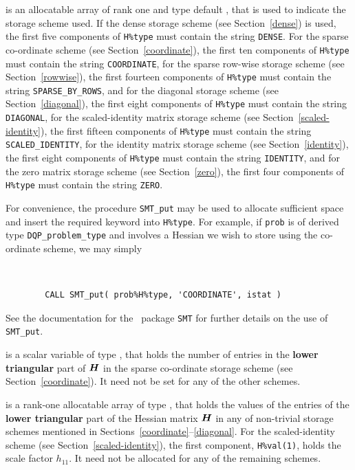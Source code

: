 \documentclass{galahad}
\newcommand{\packagename}{DQP}
\begin{document}
\begin{description}
\begin{description}
 is an allocatable array of rank one and type default \character,
that is used to indicate the storage scheme used. If the dense storage scheme
(see Section~\ref{dense}) is used,
the first five components of {\tt H\%type} must contain the
string {\tt DENSE}.
For the sparse co-ordinate scheme (see Section~\ref{coordinate}),
the first ten components of {\tt H\%type} must contain the
string {\tt COORDINATE},
for the sparse row-wise storage scheme (see Section~\ref{rowwise}),
the first fourteen components of {\tt H\%type} must contain the
string {\tt SPARSE\_BY\_ROWS},
and for the diagonal storage scheme (see Section~\ref{diagonal}),
the first eight components of {\tt H\%type} must contain the
string {\tt DIAGONAL},
for the scaled-identity matrix storage scheme
(see Section~\ref{scaled-identity}),
the first fifteen components of {\tt H\%type} must contain the
string {\tt SCALED\_IDENTITY},
for the identity matrix storage scheme
(see Section~\ref{identity}),
the first eight components of {\tt H\%type} must contain the
string {\tt IDENTITY}, and
for the zero matrix storage scheme
(see Section~\ref{zero}),
the first four components of {\tt H\%type} must contain the
string {\tt ZERO}.

For convenience, the procedure {\tt SMT\_put}
may be used to allocate sufficient space and insert the required keyword
into {\tt H\%type}.
For example, if {\tt prob} is of derived type {\tt \packagename\_problem\_type}
and involves a Hessian we wish to store using the co-ordinate scheme,
we may simply
{\tt
\begin{verbatim}
        CALL SMT_put( prob%H%type, 'COORDINATE', istat )
\end{verbatim}
}
\noindent
See the documentation for the \galahad\ package {\tt SMT}
for further details on the use of {\tt SMT\_put}.

 is a scalar variable of type \integer, that
holds the number of entries in the {\bf lower triangular} part of ${\bm{H}}$
in the sparse co-ordinate storage scheme (see Section~\ref{coordinate}).
It need not be set for any of the other schemes.

 is a rank-one allocatable array of type \realdp, that holds
the values of the entries of the {\bf lower triangular} part
of the Hessian matrix ${\bm{H}}$ in any of non-trivial storage schemes
mentioned in Sections~\ref{coordinate}--\ref{diagonal}.
For the scaled-identity scheme (see Section~\ref{scaled-identity}),
the first component, {\tt H\%val(1)}, holds the scale factor $h_{11}$.
It need not be allocated for any of the remaining schemes.


\end{description}
\end{description}
\end{document}
